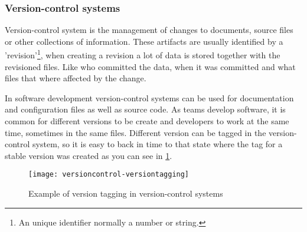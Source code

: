 \subsubsection{Version-control systems}
Version-control system is the management of changes to documents, source files or other collections of information. These artifacts are usually identified by a 'revision'\footnote{An unique identifier normally a number or string.}, when creating a revision a lot of data is stored together with the revisioned files. Like who committed the data, when it was committed and what files that where affected by the change.

In software development version-control systems can be used for documentation and configuration files as well as source code. As teams develop software, it is common for different versions to be create and developers to work at the same time, sometimes in the same files. Different version can be tagged in the version-control system, so it is easy to back in time to that state where the tag for a stable version was created as you can see in \ref{versiontagging}.

\begin{figure}[!htpb]
\centering
	\texttt{[image: versioncontrol-versiontagging]}
\caption{Example of version tagging in version-control systems}
\label{versiontagging}
\end{figure}



